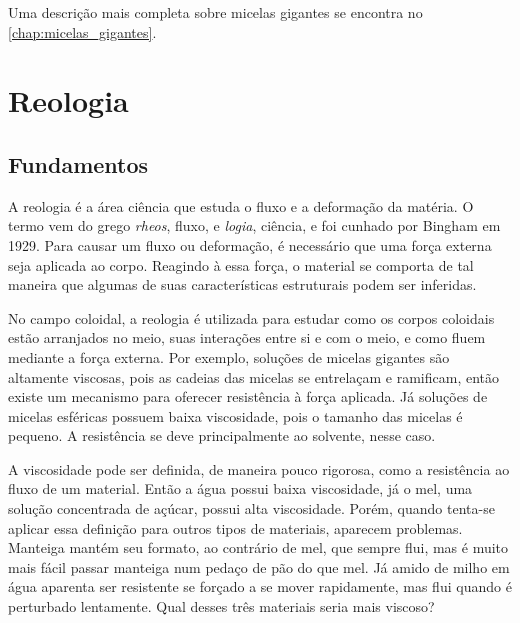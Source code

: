 	Uma descrição mais completa sobre micelas gigantes se encontra no \autoref{chap:micelas_gigantes}.

	\chapter{Reologia}
		\section{Fundamentos} 
		
		A reologia é a área ciência que estuda o fluxo e a deformação da matéria. O termo vem do grego \emph{rheos}, fluxo, e \emph{logia}, ciência, e foi cunhado por Bingham em 1929.\cite{Bingham1929} Para causar um fluxo ou deformação, é necessário que uma força externa seja aplicada ao corpo. Reagindo à essa força, o material se comporta de tal maneira que algumas de suas características estruturais podem ser inferidas. %
		
		No campo coloidal, a reologia é utilizada para estudar como os corpos coloidais estão arranjados no meio, suas interações entre si e com o meio, e como fluem mediante a força externa. Por exemplo, soluções de micelas gigantes são altamente viscosas, pois as cadeias das micelas se entrelaçam e ramificam,\cite{Rehage1991} então existe um mecanismo para oferecer resistência à força aplicada. Já soluções de micelas esféricas possuem baixa viscosidade, pois o tamanho das micelas é pequeno. A resistência se deve principalmente ao solvente, nesse caso.
		
		A viscosidade pode ser definida, de maneira pouco rigorosa, como a resistência ao fluxo de um material.\cite{Boger1989}  Então a água possui baixa viscosidade, já o mel, uma solução concentrada de açúcar, possui alta viscosidade. Porém, quando tenta-se aplicar essa definição para outros tipos de materiais, aparecem problemas. Manteiga mantém seu formato, ao contrário de mel, que sempre flui, mas é muito mais fácil passar manteiga num pedaço de pão do que mel. Já amido de milho em água aparenta ser resistente se forçado a se mover rapidamente, mas flui quando é perturbado lentamente. Qual desses três materiais seria mais viscoso? 
		

